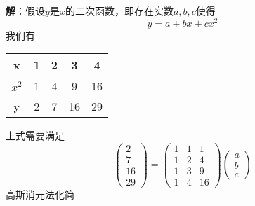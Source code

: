{\bf 解}：假设$y$是$x$的二次函数，即存在实数$a,b,c$使得
$$y = a + bx + cx^2$$
我们有
\begin{table}[H]
    \centering
    \begin{tabular}{|c|c|c|c|c|}
    \toprule
         x & 1 & 2 & 3 & 4 \\ \hline
         $x^2$ & 1 & 4 & 9 & 16 \\ \hline
         y & 2 & 7 & 16 & 29 \\
    \bottomrule
    \end{tabular}
\end{table}
上式需要满足
$$\begin{pmatrix} 2 \\ 7 \\ 16 \\ 29 \end{pmatrix} = \begin{pmatrix} 1 & 1 & 1 \\ 1 & 2 & 4 \\ 1 & 3 & 9 \\ 1 & 4 & 16 \end{pmatrix} \begin{pmatrix} a \\ b \\ c \end{pmatrix}$$
高斯消元法化简
